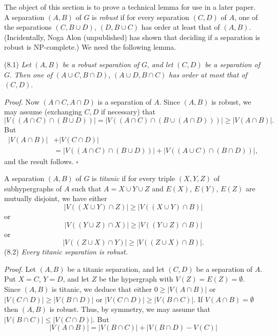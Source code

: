 
The object of this section is to prove a technical lemma for use in a later paper. A separation $(A, B)$ of $G$ is \textit{robust} if for every separation $(C, D)$ of $A$, one of the separations $(C, B \cup D)$, $(D, B \cup C)$ has order at least that of $(A, B)$. (Incidentally, Noga Alon (unpublished) has shown that deciding if a separation is robust is NP-complete.) We need the following lemma.

\stmt
(8.1) \textit{Let} $(A, B)$ \textit{be a robust separation of} $G$, \textit{and let} $(C, D)$ \textit{be a separation of} $G$. \textit{Then one of} $(A \cup C, B \cap D)$, $(A \cup D, B \cap C)$ \textit{has order at most that of} $(C, D)$.

\textit{Proof.} Now $(A \cap C, A \cap D)$ is a separation of $A$. Since $(A, B)$ is robust, we may assume (exchanging $C, D$ if necessary) that
\begin{equation*}
|V((A \cap C) \cap (B \cup D))| = |V((A \cap C) \cap (B \cup (A \cap D)))| \ge |V(A \cap B)|.
\end{equation*}
But
\begin{align*}
|V(A \cap B)| &+ |V(C \cap D)| \\
&= |V((A \cap C) \cap (B \cup D))| + |V((A \cup C) \cap (B \cap D))|,
\end{align*}
and the result follows. $\square$

A separation $(A, B)$ of $G$ is \textit{titanic} if for every triple $(X, Y, Z)$ of subhypergraphs of $A$ such that $A = X \cup Y \cup Z$ and $E(X)$, $E(Y)$, $E(Z)$ are mutually disjoint, we have either
\begin{equation*}
|V((X \cup Y) \cap Z)| \ge |V((X \cup Y) \cap B)|
\end{equation*}
or
\begin{equation*}
|V((Y \cup Z) \cap X)| \ge |V((Y \cup Z) \cap B)|
\end{equation*}
or
\begin{equation*}
|V((Z \cup X) \cap Y)| \ge |V((Z \cup X) \cap B)|.
\end{equation*}
\stmt
(8.2) \textit{Every titanic separation is robust.}

\textit{Proof.} Let $(A, B)$ be a titanic separation, and let $(C, D)$ be a separation of $A$. Put $X = C$, $Y = D$, and let $Z$ be the hypergraph with $V(Z) = E(Z) = \emptyset$. Since $(A, B)$ is titanic, we deduce that either $0 \ge |V(A \cap B)|$ or $|V(C \cap D)| \ge |V(B \cap D)|$ or $|V(C \cap D)| \ge |V(B \cap C)|$. If $V(A \cap B) = \emptyset$ then $(A, B)$ is robust. Thus, by symmetry, we may assume that $|V(B \cap C)| \le |V(C \cap D)|$. But
\begin{equation*}
|V(A \cap B)| = |V(B \cap C)| + |V(B \cap D) - V(C)|
\end{equation*}
